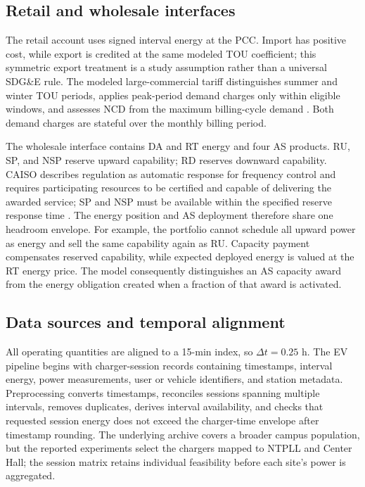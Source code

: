 \documentclass[final,5p,times]{elsarticle}
\newcommand{\dt}{\Delta t}
\begin{document}
\subsection{Retail and wholesale interfaces}
The retail account uses signed interval energy at the PCC. Import has positive cost, while export is credited at the same modeled TOU coefficient; this symmetric export treatment is a study assumption rather than a universal SDG\&E rule. The modeled large-commercial tariff distinguishes summer and winter TOU periods, applies peak-period demand charges only within eligible windows, and assesses NCD from the maximum billing-cycle demand \cite{sdgeLargeCommercial2025} \cite{sdgeDemandGuide2026}. Both demand charges are stateful over the monthly billing period.

The wholesale interface contains DA and RT energy and four AS products. RU, SP, and NSP reserve upward capability; RD reserves downward capability. CAISO describes regulation as automatic response for frequency control and requires participating resources to be certified and capable of delivering the awarded service; SP and NSP must be available within the specified reserve response time \cite{caisoAncillary2026}. The energy position and AS deployment therefore share one headroom envelope. For example, the portfolio cannot schedule all upward power as energy and sell the same capability again as RU. Capacity payment compensates reserved capability, while expected deployed energy is valued at the RT energy price. The model consequently distinguishes an AS capacity award from the energy obligation created when a fraction of that award is activated.

\subsection{Data sources and temporal alignment}
All operating quantities are aligned to a 15-min index, so $\dt=0.25$ h. The EV pipeline begins with charger-session records containing timestamps, interval energy, power measurements, user or vehicle identifiers, and station metadata. Preprocessing converts timestamps, reconciles sessions spanning multiple intervals, removes duplicates, derives interval availability, and checks that requested session energy does not exceed the charger-time envelope after timestamp rounding. The underlying archive covers a broader campus population, but the reported experiments select the chargers mapped to NTPLL and Center Hall; the session matrix retains individual feasibility before each site's power is aggregated.
\end{document}
